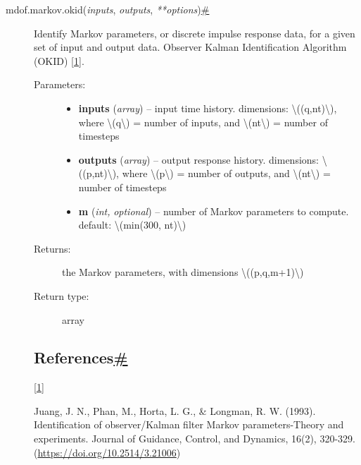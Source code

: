\begin{description}
\item[{ {{mdof.markov.}}{{okid}}{(}\emph{{{inputs}}},
\emph{{{outputs}}},
\emph{{{**}}{{options}}}{)}\protect\hyperlink{mdof.markov.okid}{\#}}]
Identify Markov parameters, or discrete impulse response data, for a
given set of input and output data. Observer Kalman Identification
Algorithm (OKID) \protect\hyperlink{id2}{{{[}}1{{]}}}.

\begin{description}
\item[Parameters{:}]
\begin{itemize}
\item
  \textbf{inputs} (\emph{array}) -- input time history. dimensions:
  {\textbackslash{}((q,nt)\textbackslash{})}, where
  {\textbackslash{}(q\textbackslash{})} = number of inputs, and
  {\textbackslash{}(nt\textbackslash{})} = number of timesteps
\item
  \textbf{outputs} (\emph{array}) -- output response history.
  dimensions: {\textbackslash{}((p,nt)\textbackslash{})}, where
  {\textbackslash{}(p\textbackslash{})} = number of outputs, and
  {\textbackslash{}(nt\textbackslash{})} = number of timesteps
\item
  \textbf{m} (\emph{int,} \emph{optional}) -- number of Markov
  parameters to compute. default: {\textbackslash{}(min(300,
  nt)\textbackslash{})}
\end{itemize}
\item[Returns{:}]
the Markov parameters, with dimensions
{\textbackslash{}((p,q,m+1)\textbackslash{})}
\item[Return type{:}]
array
\end{description}

\hypertarget{references}{}
\hypertarget{references}{%
\subsection{\texorpdfstring{References\protect\hyperlink{references}{\#}}{References\#}}\label{references}}

{{{[}}\protect\hyperlink{id1}{1}{{]}}}

Juang, J. N., Phan, M., Horta, L. G., \& Longman, R. W. (1993).
Identification of observer/Kalman filter Markov parameters-Theory and
experiments. Journal of Guidance, Control, and Dynamics, 16(2), 320-329.
(\url{https://doi.org/10.2514/3.21006})
\end{description}

\href{index.html}{\emph{}}

